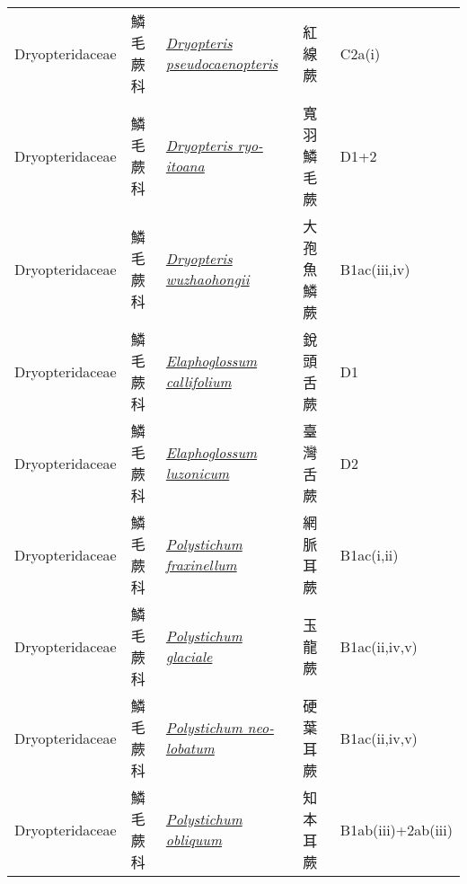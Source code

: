 {\begin{longtable}{p{2.5cm}p{2cm}p{5cm}p{2.5cm}p{3cm}}
    Dryopteridaceae & 鱗毛蕨科 & \href{http://www.theplantlist.org/tpl1.1/search?q=Dryopteris+pseudocaenopteris}{\textit{Dryopteris pseudocaenopteris} } & 紅線蕨 & C2a(i) \index{Dryopteris@\textit{Dryopteris}!pseudocaenopteris@\textit{pseudocaenopteris}}  \index{紅線蕨} \\
    Dryopteridaceae & 鱗毛蕨科 & \href{http://www.theplantlist.org/tpl1.1/search?q=Dryopteris+ryo-itoana}{\textit{Dryopteris ryo-itoana} } & 寬羽鱗毛蕨 & D1+2 \index{Dryopteris@\textit{Dryopteris}!ryo-itoana@\textit{ryo-itoana}}  \index{寬羽鱗毛蕨} \\
    Dryopteridaceae & 鱗毛蕨科 & \href{http://www.theplantlist.org/tpl1.1/search?q=Dryopteris+wuzhaohongii}{\textit{Dryopteris wuzhaohongii} } & 大孢魚鱗蕨 & B1ac(iii,iv) \index{Dryopteris@\textit{Dryopteris}!wuzhaohongii@\textit{wuzhaohongii}}  \index{大孢魚鱗蕨} \\
    Dryopteridaceae & 鱗毛蕨科 & \href{http://www.theplantlist.org/tpl1.1/search?q=Elaphoglossum+callifolium}{\textit{Elaphoglossum callifolium} } & 銳頭舌蕨 & D1 \index{Elaphoglossum@\textit{Elaphoglossum}!callifolium@\textit{callifolium}}  \index{銳頭舌蕨} \\
    Dryopteridaceae & 鱗毛蕨科 & \href{http://www.theplantlist.org/tpl1.1/search?q=Elaphoglossum+luzonicum}{\textit{Elaphoglossum luzonicum} } & 臺灣舌蕨 & D2 \index{Elaphoglossum@\textit{Elaphoglossum}!luzonicum@\textit{luzonicum}}  \index{臺灣舌蕨} \\
    Dryopteridaceae & 鱗毛蕨科 & \href{http://www.theplantlist.org/tpl1.1/search?q=Polystichum+fraxinellum}{\textit{Polystichum fraxinellum} } & 網脈耳蕨 & B1ac(i,ii) \index{Polystichum@\textit{Polystichum}!fraxinellum@\textit{fraxinellum}}  \index{網脈耳蕨} \\
    Dryopteridaceae & 鱗毛蕨科 & \href{http://www.theplantlist.org/tpl1.1/search?q=Polystichum+glaciale}{\textit{Polystichum glaciale} } & 玉龍蕨 & B1ac(ii,iv,v) \index{Polystichum@\textit{Polystichum}!glaciale@\textit{glaciale}}  \index{玉龍蕨} \\
    Dryopteridaceae & 鱗毛蕨科 & \href{http://www.theplantlist.org/tpl1.1/search?q=Polystichum+neo-lobatum}{\textit{Polystichum neo-lobatum} } & 硬葉耳蕨 & B1ac(ii,iv,v) \index{Polystichum@\textit{Polystichum}!neo-lobatum@\textit{neo-lobatum}}  \index{硬葉耳蕨} \\
    Dryopteridaceae & 鱗毛蕨科 & \href{http://www.theplantlist.org/tpl1.1/search?q=Polystichum+obliquum}{\textit{Polystichum obliquum} } & 知本耳蕨 & B1ab(iii)+2ab(iii) \index{Polystichum@\textit{Polystichum}!obliquum@\textit{obliquum}}  \index{知本耳蕨} \\

\end{longtable}}
